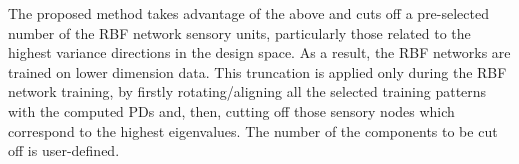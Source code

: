 The proposed method takes advantage of the above and cuts off a pre-selected number of the RBF network sensory units, particularly those related to the highest variance directions in the design space. As a result, the RBF networks are trained on lower dimension data. 
This truncation is applied only during the RBF network training, by firstly rotating/aligning all the selected training patterns with the computed PDs and, then, cutting off those sensory nodes which correspond to the highest eigenvalues. The number of the components to be cut off is user-defined.
    
    
    

